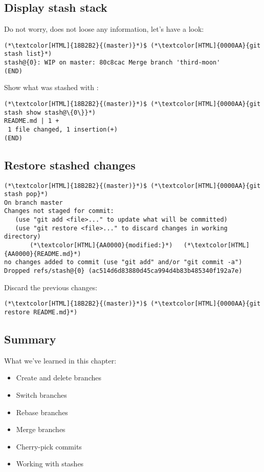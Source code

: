 \subsection{Display stash stack}
\begin{frame}[fragile]
  \subslidetitle
  Do not worry,  does not loose any information, let's have a look:

  \begin{lstlisting}
(*\textcolor[HTML]{18B2B2}{(master)}*)$ (*\textcolor[HTML]{0000AA}{git stash list}*)
stash@{0}: WIP on master: 80c8cac Merge branch 'third-moon'
(END)
\end{lstlisting}
  Show what was stashed with :
  \begin{lstlisting}
(*\textcolor[HTML]{18B2B2}{(master)}*)$ (*\textcolor[HTML]{0000AA}{git stash show stash@\{0\}}*)
README.md | 1 +
 1 file changed, 1 insertion(+)
(END)
\end{lstlisting}

\end{frame}

\subsection{Restore stashed changes}
\begin{frame}[fragile]
  \subslidetitle

  \begin{lstlisting}
(*\textcolor[HTML]{18B2B2}{(master)}*)$ (*\textcolor[HTML]{0000AA}{git stash pop}*)
On branch master
Changes not staged for commit:
   (use "git add <file>..." to update what will be committed)
   (use "git restore <file>..." to discard changes in working directory)
       (*\textcolor[HTML]{AA0000}{modified:}*)   (*\textcolor[HTML]{AA0000}{README.md}*)
no changes added to commit (use "git add" and/or "git commit -a")
Dropped refs/stash@{0} (ac514d6d83880d45ca994d4b83b485340f192a7e)
\end{lstlisting}
  Discard the previous changes:
  \begin{lstlisting}
(*\textcolor[HTML]{18B2B2}{(master)}*)$ (*\textcolor[HTML]{0000AA}{git restore README.md}*)
\end{lstlisting}
\end{frame}

\subsection{Summary}
\begin{frame}[fragile]
\subslidetitle
  What we've learned in this chapter:
  \begin{itemize}
    \item Create and delete branches
    \item Switch branches
    \item Rebase branches
    \item Merge branches
    \item Cherry-pick commits
    \item Working with stashes
  \end{itemize}
\end{frame}
